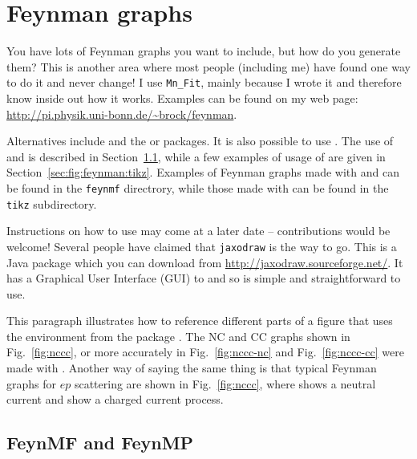 \section{Feynman graphs}
\label{sec:fig:feynman}

You have lots of Feynman graphs you want to include, but how do you
generate them? This is another area where most people (including me)
have found one way to do it and never change! I use \texttt{Mn\_Fit},
mainly because I wrote it and therefore know inside out how it
works. Examples can be found on my web page:
\url{http://pi.physik.uni-bonn.de/~brock/feynman}.

Alternatives include  and the  or
 packages.  It is also possible to use
. The use of  and  is
described in Section~\ref{sec:fig:feynman:feynmf}, while a few
examples of usage of  are given in
Section~\ref{sec:fig:feynman:tikz}. Examples of Feynman graphs made
with  and  can be found in the
\texttt{feynmf} directrory, while those made with  can
be found in the \texttt{tikz} subdirectory.

Instructions on how to use  may come at a later
date -- contributions would be welcome! Several people have claimed
that \texttt{jaxodraw} is the way to go. This is a Java package which
you can download from \url{http://jaxodraw.sourceforge.net/}. It has
a Graphical User Interface (GUI) to  and so is simple and
straightforward to use.

This paragraph illustrates how to reference different parts of a
figure that uses the environment  from the package .
The NC and CC graphs shown in
Fig.~\ref{fig:nccc}, or more accurately in Fig.~\ref{fig:nccc-nc} and
Fig.~\ref{fig:nccc-cc} were made with . Another way of
saying the same thing is that typical Feynman graphs for $ep$
scattering are shown in Fig.~\ref{fig:nccc}, where
 shows a neutral current and 
show a charged current process.


\subsection{FeynMF and FeynMP}
\label{sec:fig:feynman:feynmf}

